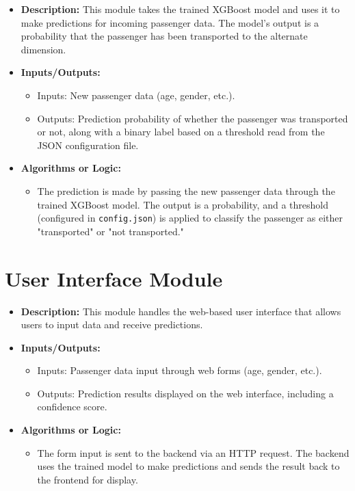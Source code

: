 \documentclass[15pt]{article}
\begin{document}
\begin{itemize}
    \item \textbf{Description:} This module takes the trained XGBoost model and uses it to make predictions for incoming passenger data. The model's output is a probability that the passenger has been transported to the alternate dimension.
    \item \textbf{Inputs/Outputs:} 
    \begin{itemize}
        \item Inputs: New passenger data (age, gender, etc.).
        \item Outputs: Prediction probability of whether the passenger was transported or not, along with a binary label based on a threshold read from the JSON configuration file.
    \end{itemize}
    \item \textbf{Algorithms or Logic:} 
    \begin{itemize}
        \item The prediction is made by passing the new passenger data through the trained XGBoost model. The output is a probability, and a threshold (configured in \texttt{config.json}) is applied to classify the passenger as either "transported" or "not transported."
    \end{itemize}
\end{itemize}

\section{User Interface Module}

\begin{itemize}
    \item \textbf{Description:} This module handles the web-based user interface that allows users to input data and receive predictions.
    \item \textbf{Inputs/Outputs:} 
    \begin{itemize}
        \item Inputs: Passenger data input through web forms (age, gender, etc.).
        \item Outputs: Prediction results displayed on the web interface, including a confidence score.
    \end{itemize}
    \item \textbf{Algorithms or Logic:} 
    \begin{itemize}
        \item The form input is sent to the backend via an HTTP request. The backend uses the trained model to make predictions and sends the result back to the frontend for display.
    \end{itemize}
\end{itemize}
\end{document}
